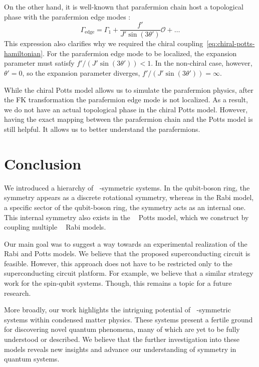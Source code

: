 \documentclass[reprint, aps, prx, amsmath, amssymb, longbibliography, superscriptaddress]{revtex4-2}
\DeclareMathOperator{\Zn}{\mathbb{Z}_n}
\DeclareMathOperator{\Zthree}{\mathbb{Z}_3}
\begin{document}
On the other hand, it is well-known that parafermion chain host a topological phase with the parafermion edge modes  \cite{fendley_parafermionic_2012}:
\begin{equation}
\label{eq:parafermion-edge-mode}
\Gamma_{\text{edge}} = \Gamma_1 + \frac{f'}{J' \sin(3\theta')} \mathcal{O} + \dots
\end{equation}
This expression also clarifies why we required the chiral coupling~\eqref{eq:chiral-potts-hamiltonian}. For the parafermion edge mode to be localized, the expansion parameter must satisfy $f'/(J'\sin(3\theta')) < 1$. In the non-chiral case, however, $\theta' = 0 $, so the expansion parameter diverges, $f'/(J'\sin(3\theta')) = \infty$.

While the chiral Potts model allows us to simulate the parafermion physics, after the FK transformation the parafermion edge mode is not localized. As a result, we do not have an actual topological phase in the chiral Potts model. However, having the exact mapping between the parafermion chain and the Potts model is still helpful. It allows us to better understand the parafermions.



\section{Conclusion}
\label{sec:conclusion}

We introduced a hierarchy of $\Zthree$-symmetric systems. In the qubit-boson ring, the $\Zthree$ symmetry appears as a discrete rotational symmetry, whereas in the Rabi model, a specific sector of the qubit-boson ring, the symmetry acts as an internal one. This internal symmetry also exists in the $\Zthree$ Potts model, which we construct by coupling multiple $\Zthree$ Rabi models.

Our main goal was to suggest a way towards an experimental realization of the $\Zthree$ Rabi and Potts models. We believe that the proposed superconducting circuit is feasible. However, this approach does not have to be restricted only to the superconducting circuit platform. For example, we believe that a similar strategy work for the spin-qubit systems. Though, this remains a topic for a future research.

More broadly, our work highlights the intriguing potential of $\Zn$-symmetric systems within condensed matter physics. These systems present a fertile ground for discovering novel quantum phenomena, many of which are yet to be fully understood or described. We believe that the further investigation into these models reveals new insights and advance our understanding of symmetry in quantum systems.
\end{document}
